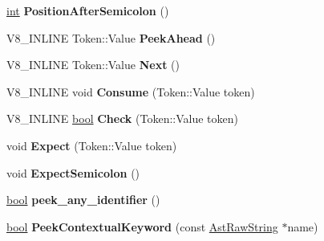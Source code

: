 \begin{DoxyCompactItemize}
\mbox{\label{classv8_1_1internal_1_1ParserBase_a2dcb23f3f5ab96835ffb99e4191c26c1}} 
\mbox{\hyperlink{classint}{int}} {\bfseries Position\+After\+Semicolon} ()
\item 
\mbox{\label{classv8_1_1internal_1_1ParserBase_a17d9456ae891a8b5932cf00a5bf8659f}} 
V8\+\_\+\+I\+N\+L\+I\+NE Token\+::\+Value {\bfseries Peek\+Ahead} ()
\item 
\mbox{\label{classv8_1_1internal_1_1ParserBase_a7325bef3200d6668a62a7462e3b2ff42}} 
V8\+\_\+\+I\+N\+L\+I\+NE Token\+::\+Value {\bfseries Next} ()
\item 
\mbox{\label{classv8_1_1internal_1_1ParserBase_a678b7a2c459324f52a847b54c0f7b2b6}} 
V8\+\_\+\+I\+N\+L\+I\+NE void {\bfseries Consume} (Token\+::\+Value token)
\item 
\mbox{\label{classv8_1_1internal_1_1ParserBase_a9a7addcc1503b13668547c20468d9608}} 
V8\+\_\+\+I\+N\+L\+I\+NE \mbox{\hyperlink{classbool}{bool}} {\bfseries Check} (Token\+::\+Value token)
\item 
\mbox{\label{classv8_1_1internal_1_1ParserBase_a47a03fe1e0a35067b1794f78c5afbe69}} 
void {\bfseries Expect} (Token\+::\+Value token)
\item 
\mbox{\label{classv8_1_1internal_1_1ParserBase_ac3045c3f1e12b268a7c0283b46d7a232}} 
void {\bfseries Expect\+Semicolon} ()
\item 
\mbox{\label{classv8_1_1internal_1_1ParserBase_aadc7706d1adb97e7a5ca269ef0fe2ad7}} 
\mbox{\hyperlink{classbool}{bool}} {\bfseries peek\+\_\+any\+\_\+identifier} ()
\item 
\mbox{\label{classv8_1_1internal_1_1ParserBase_a53acb29427067677587737caca7c5304}} 
\mbox{\hyperlink{classbool}{bool}} {\bfseries Peek\+Contextual\+Keyword} (const \mbox{\hyperlink{classv8_1_1internal_1_1AstRawString}{Ast\+Raw\+String}} $\ast$name)
\item 

\end{DoxyCompactItemize}
